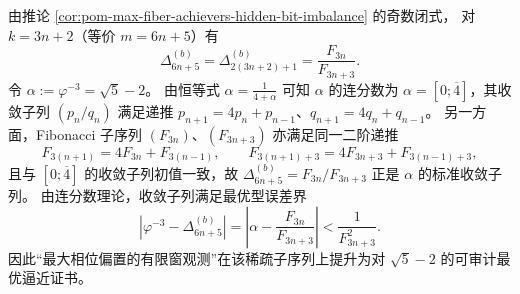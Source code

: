 \begin{remark}\label{rem:pom-max-fiber-bias-amplitude-cf-acceleration}
由推论 \ref{cor:pom-max-fiber-achievers-hidden-bit-imbalance} 的奇数闭式，
对 \(k=3n+2\)（等价 \(m=6n+5\)）有
\[
\Delta_{6n+5}^{(b)}=\Delta_{2(3n+2)+1}^{(b)}=\frac{F_{3n}}{F_{3n+3}}.
\]
令 \(\alpha:=\varphi^{-3}=\sqrt5-2\)。
由恒等式 \(\alpha=\frac{1}{4+\alpha}\) 可知 \(\alpha\) 的连分数为 \(\alpha=[0;\overline{4}]\)，其收敛子列 \((p_n/q_n)\) 满足递推
\(
p_{n+1}=4p_n+p_{n-1}
\)、\(
q_{n+1}=4q_n+q_{n-1}
\)。
另一方面，Fibonacci 子序列 \((F_{3n})\)、\((F_{3n+3})\) 亦满足同一二阶递推
\[
F_{3(n+1)}=4F_{3n}+F_{3(n-1)},\qquad
F_{3(n+1)+3}=4F_{3n+3}+F_{3(n-1)+3},
\]
且与 \([0;\overline{4}]\) 的收敛子列初值一致，故 \(\Delta_{6n+5}^{(b)}=F_{3n}/F_{3n+3}\) 正是 \(\alpha\) 的标准收敛子列。
由连分数理论，收敛子列满足最优型误差界
\[
\boxed{\;
\left|\varphi^{-3}-\Delta_{6n+5}^{(b)}\right|
=\left|\alpha-\frac{F_{3n}}{F_{3n+3}}\right|
<\frac{1}{F_{3n+3}^2}.\;}
\]
因此“最大相位偏置的有限窗观测”在该稀疏子序列上提升为对 \(\sqrt5-2\) 的可审计最优逼近证书。
\end{remark}

\endinput
